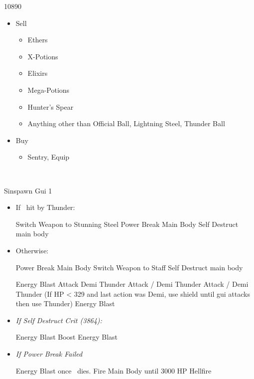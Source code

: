 \begin{shop}{10890}
	\begin{itemize}
		\item Sell
			\begin{itemize}
				\item Ethers
				\item X-Potions
				\item Elixirs
				\item Mega-Potions
				\item Hunter's Spear
				\item Anything other than Official Ball, Lightning Steel, Thunder Ball
			\end{itemize}
		\item Buy
			\begin{itemize}
				\item Sentry, Equip
			\end{itemize}
	\end{itemize}
\end{shop}
\vfill\ \columnbreak
\begin{battle}[12000]{Sinspawn Gui 1}
	\begin{itemize}
		\item If \yuna\ hit by Thunder:
			\begin{itemize}
				\tidusf Switch Weapon to Stunning Steel
				\switch{\yuna}{\auron}
				\auronf Power Break Main Body
				\switch{\wakka}{\kimahri}
				\kimahrif Self Destruct main body
				\switch{\tidus}{\yuna}
				\summon{\valefor}
			\end{itemize}
		\item Otherwise:
			\begin{itemize}
				\switch{\tidus}{\auron}
				\auronf Power Break Main Body
				\yunaf Switch Weapon to Staff
				\switch{\wakka}{\kimahri}
				\kimahrif Self Destruct main body
				\summon{\valefor}
			\end{itemize}
		\valeforf Energy Blast
		\enemyf Attack
		\enemyf Demi
		\valeforf Thunder
		\enemyf Attack / Demi
		\valeforf Thunder
		\enemyf Attack / Demi
		\valeforf Thunder (If HP < 329 and last action was Demi, use shield until gui attacks then use Thunder)
		\valeforf Energy Blast
		\item \textit{If Self Destruct Crit \textit{(3864)}:}
			\begin{itemize}
				\valeforf Energy Blast
				\valeforf Boost
				\valeforf Energy Blast
			\end{itemize}
		\item \textit{If Power Break Failed}
			\begin{itemize}
				\valeforf Energy Blast
				\summon{\ifrit} once \valefor\ dies.
				\ifritf Fire Main Body until 3000 HP
			 	\ifritf Hellfire
			\end{itemize}
	\end{itemize}
\end{battle}
